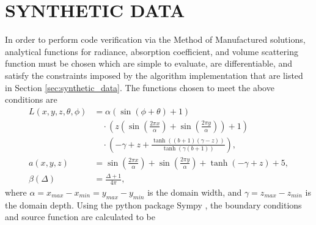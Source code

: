 \chapter{SYNTHETIC DATA}
\label{chap:synthetic_data}

In order to perform code verification via the Method of Manufactured solutions, analytical functions for radiance, absorption coefficient, and volume scattering function must be chosen which are simple to evaluate, are differentiable, and satisfy the constraints imposed by the algorithm implementation that are listed in Section \ref{sec:synthetic_data}.
The functions chosen to meet the above conditions are
\begin{align}
  L(x, y, z, \theta, \phi) &=
    \alpha \left(\sin{\left (\phi + \theta \right )} + 1\right) \nonumber\\
    &\quad\cdot \left(z \left(\sin{\left (\frac{2 \pi x}{\alpha} \right )} + \sin{\left (\frac{2 \pi y}{\alpha} \right )}\right) + 1\right) \nonumber\\
    &\quad\cdot \left(- \gamma + z + \frac{\tanh{\left (\left(b + 1\right) \left(\gamma - z\right) \right )}}{\tanh{\left (\gamma \left(b + 1\right) \right )}}\right),
  \label{eqn:mms_sol_expr} \\
  a(x, y, z) &= \sin{\left (\frac{2 \pi x}{\alpha} \right )} + \sin{\left (\frac{2 \pi y}{\alpha} \right )} + \tanh{\left (- \gamma + z \right )} + 5,
  \label{eqn:mms_abs_expr} \\
  \beta(\Delta) &= \frac{\Delta + 1}{4 \pi},
  \label{eqn:mms_vsf_expr}
\end{align}
where $\alpha=x_{max}-x_{min}=y_{max}-y_{min}$ is the domain width, and $\gamma=z_{max}-z_{min}$ is the domain depth.
Using the python package Sympy \cite{meurer_sympy:_2017}, the boundary conditions and source function are calculated to be
